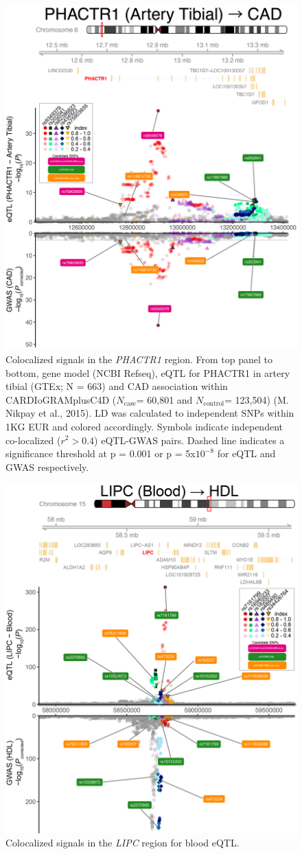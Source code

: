 \documentclass[11pt]{article}
\newcommand{\Ncase}{$N_{\textrm{case}}$\xspace}
\newcommand{\Ncontrol}{$N_{\textrm{control}}$\xspace}
\begin{document}
\begin{figure}[!ht]
  \centering
  \includegraphics[width=.7\textwidth]{figs/region/regionplot.PHACTR1_Artery_Tibial_CAD.20201218.edit.png}
  \caption{Colocalized signals in the \emph{PHACTR1} region. From top
    panel to bottom, gene model (NCBI Refseq), eQTL for PHACTR1 in
    artery tibial (GTEx; N = 663) and CAD association within
    CARDIoGRAMplusC4D (\Ncase = 60,801 and \Ncontrol = 123,504)
    (M. Nikpay et al., 2015). LD was calculated to independent SNPs
    within 1KG EUR and colored accordingly. Symbols indicate
    independent co-localized ($r^2 > 0.4$) eQTL-GWAS pairs. Dashed
    line indicates a significance threshold at p = 0.001 or p =
    5x$10^{-8}$ for eQTL and GWAS respectively.} 
\end{figure}

\begin{figure}[!ht]
  \centering
  \includegraphics[width=.7\textwidth]{figs/region/regionplot.LIPC_Blood_HDL_UKBB.20201218.edit.png}
  \caption{Colocalized signals in the \emph{LIPC} region for blood
    eQTL.}
\end{figure}  
\end{document}
